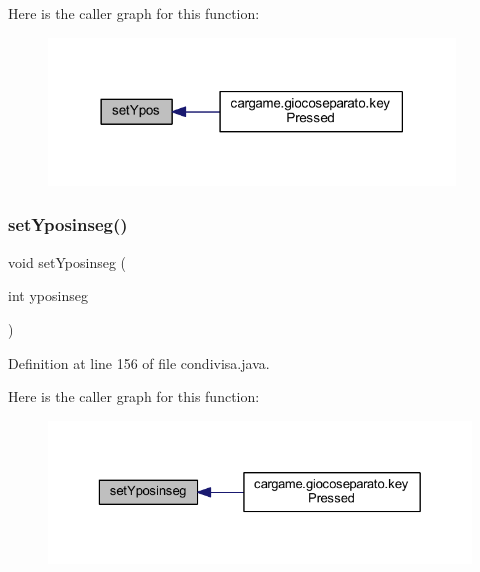 Here is the caller graph for this function\+:
\nopagebreak
\begin{figure}[H]
\begin{center}
\leavevmode
\includegraphics[width=306pt]{classcargame_1_1condivisa_aeb77b8817744feab241516cbf8a559b7_icgraph}
\end{center}
\end{figure}
\mbox{\label{classcargame_1_1condivisa_a4bc9cdd1344461ced99ee1bfc9049bea}} 
\subsubsection{\texorpdfstring{set\+Yposinseg()}{setYposinseg()}}
{\footnotesize\ttfamily void set\+Yposinseg (\begin{DoxyParamCaption}\item[{int}]{yposinseg }\end{DoxyParamCaption})}



Definition at line 156 of file condivisa.\+java.

Here is the caller graph for this function\+:
\nopagebreak
\begin{figure}[H]
\begin{center}
\leavevmode
\includegraphics[width=329pt]{classcargame_1_1condivisa_a4bc9cdd1344461ced99ee1bfc9049bea_icgraph}
\end{center}
\end{figure}


